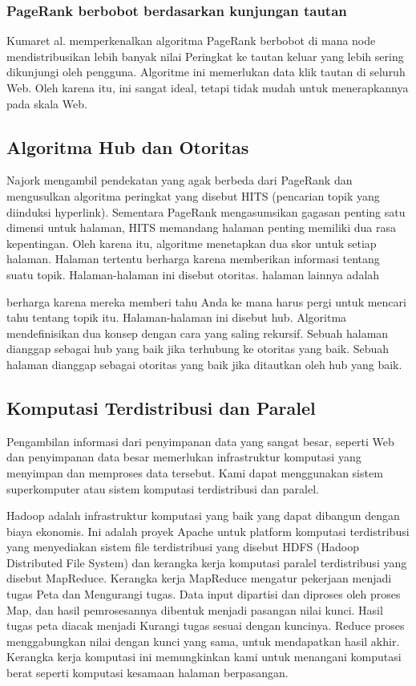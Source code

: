 \documentclass[conference]{IEEEtran}
\begin{document}
\subsubsection{PageRank berbobot berdasarkan kunjungan tautan}
Kumaret al.\cite{kumar2013pagerank} memperkenalkan algoritma PageRank berbobot di mana node mendistribusikan lebih banyak nilai Peringkat ke tautan keluar yang lebih sering dikunjungi oleh pengguna. Algoritme ini memerlukan data klik tautan di seluruh Web. Oleh karena itu, ini sangat ideal, tetapi tidak mudah untuk menerapkannya pada skala Web.

\subsection{Algoritma Hub dan Otoritas}
Najork\cite{najork2007comparing} mengambil pendekatan yang agak berbeda dari PageRank dan mengusulkan algoritma peringkat yang disebut HITS (pencarian topik yang diinduksi hyperlink). Sementara PageRank mengasumsikan gagasan penting satu dimensi untuk halaman, HITS memandang halaman penting memiliki dua rasa kepentingan.\cite{leskovec2020mining} Oleh karena itu, algoritme menetapkan dua skor untuk setiap halaman. Halaman tertentu berharga karena memberikan informasi tentang suatu topik. Halaman-halaman ini disebut otoritas. halaman lainnya adalah 

berharga karena mereka memberi tahu Anda ke mana harus pergi untuk mencari tahu tentang topik itu. Halaman-halaman ini disebut hub. Algoritma mendefinisikan dua konsep dengan cara yang saling rekursif. Sebuah halaman dianggap sebagai hub yang baik jika terhubung ke otoritas yang baik. Sebuah halaman dianggap sebagai otoritas yang baik jika ditautkan oleh hub yang baik.\cite{leskovec2020mining}

\subsection{Komputasi Terdistribusi dan Paralel}
Pengambilan informasi dari penyimpanan data yang sangat besar, seperti Web dan penyimpanan data besar memerlukan infrastruktur komputasi yang menyimpan dan memproses data tersebut. Kami dapat menggunakan sistem superkomputer atau sistem komputasi terdistribusi dan paralel.

Hadoop\cite{dean2008mapreduce} adalah infrastruktur komputasi yang baik yang dapat dibangun dengan biaya ekonomis.
Ini adalah proyek Apache untuk platform komputasi terdistribusi yang menyediakan sistem file terdistribusi yang disebut HDFS (Hadoop Distributed File System) dan kerangka kerja komputasi paralel terdistribusi yang disebut MapReduce. Kerangka kerja MapReduce mengatur pekerjaan menjadi tugas Peta dan Mengurangi tugas. Data input dipartisi dan diproses oleh proses Map,
dan hasil pemrosesannya dibentuk menjadi pasangan nilai kunci. Hasil tugas peta diacak menjadi Kurangi tugas sesuai dengan kuncinya. Reduce proses menggabungkan nilai dengan kunci yang sama, untuk mendapatkan hasil akhir. Kerangka kerja komputasi ini memungkinkan kami untuk menangani komputasi berat seperti komputasi kesamaan halaman berpasangan.
\end{document}
